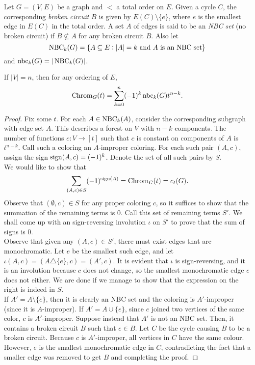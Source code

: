 	\begin{fdef}
		Let $G = (V,E)$ be a graph and $<$ a total order on $E$. Given a cycle $C$, the corresponding \emph{broken circuit} $B$ is given by $E(C) \setminus \{e\}$, where $e$ is the smallest edge in $E(C)$ in the total order. A set $A$ of edges is said to be an \emph{NBC set} (no broken circuit) if $B \not\subseteq A$ for any broken circuit $B$. Also let
		\[ \operatorname{NBC}_k(G) = \{ A \subseteq E : |A| = k \text{ and $A$ is an NBC set} \} \]
		and $\operatorname{nbc}_k(G) = |\operatorname{NBC}_k(G)|$.\\
	\end{fdef}

	\begin{ftheo}
		\label{theo: coeffs of chrom poly nbc}
		If $|V| = n$, then for any ordering of $E$,
		\[ \operatorname{Chrom}_G(t) = \sum_{k=0}^n (-1)^k \operatorname{nbc}_k(G) t^{n-k}. \]	
	\end{ftheo}
	\begin{proof}
		Fix some $t$. For each $A \in \operatorname{NBC}_k(A)$, consider the corresponding subgraph with edge set $A$. This describes a forest on $V$ with $n-k$ components. The number of functions $c : V \to [t]$ such that $c$ is constant on components of $A$ is $t^{n-k}$. Call such a coloring an $A$-improper coloring. For each such pair $(A,c)$, assign the sign $\operatorname{sign}(A,c) = (-1)^k$. Denote the set of all such pairs by $S$. \\
		We would like to show that
		\[ \sum_{(A,c) \in S} (-1)^{\operatorname{sign}(A)} = \operatorname{Chrom}_G(t) = c_t(G). \]
		Observe that $(\emptyset,c) \in S$ for any proper coloring $c$, so it suffices to show that the summation of the remaining terms is $0$. Call this set of remaining terms $S'$. We shall come up with an sign-reversing involution $\iota$ on $S'$ to prove that the sum of signs is $0$.\\
		Observe that given any $(A,c) \in S'$, there must exist edges that are monochromatic. Let $e$ be the smallest such edge, and let $\iota(A,c) = (A\triangle \{e\},c) = (A',c)$. It is evident that $\iota$ is sign-reversing, and it is an involution because $c$ does not change, so the smallest monochromatic edge $e$ does not either. We are done if we manage to show that the expression on the right is indeed in $S$.\\
		If $A' = A \setminus \{e\}$, then it is clearly an NBC set and the coloring is $A'$-improper (since it is $A$-improper). If $A' = A \cup \{e\}$, since $e$ joined two vertices of the same color, $c$ is $A'$-improper. Suppose instead that $A'$ is not an NBC set. Then, it contains a broken circuit $B$ such that $e \in B$. Let $C$ be the cycle causing $B$ to be a broken circuit. Because $c$ is $A'$-improper, all vertices in $C$ have the same colour. However, $e$ is the smallest monochromatic edge in $C$, contradicting the fact that a smaller edge was removed to get $B$ and completing the proof.
	\end{proof}

